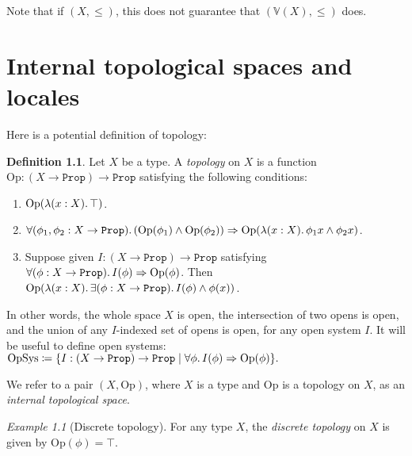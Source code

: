 \documentclass[11pt, oneside, article]{memoir}
\theoremstyle{plain}
\theoremstyle{definition}
\newtheorem{definition}[theorem]{Definition}
\theoremstyle{remark}
\newtheorem{example}[theorem]{Example}
\newcommand{\const}[1]{\mathtt{#1}}
\newcommand{\Set}[1]{\mathrm{#1}}
\newcommand{\VV}{\mathbb{V}}
\newcommand{\Prop}{\const{Prop}}
\newcommand{\Op}{\Set{Op}}
\newcommand{\imp}{\Rightarrow}
\begin{document}
Note that if $(X,\leq)$, this does not guarantee that $(\VV(X),\leq)$ does.

\chapter{Internal topological spaces and locales}


Here is a potential definition of topology:
\begin{definition}
Let $X$ be a type. A \emph{topology} on $X$ is a function $\Op:(X\to\Prop)\to\Prop$ satisfying the following conditions:
\begin{enumerate}
	\item $\Op(\lambda(x:X)\ldotp\top)$.
	\item $\forall(\phi_1,\phi_2:X\to\Prop)\ldotp(\Op(\phi_1)\wedge\Op(\phi_2))\imp\Op(\lambda(x:X)\ldotp\phi_1 x\wedge\phi_2 x)$.
	\item Suppose given $I:(X\to\Prop)\to\Prop$ satisfying $\forall(\phi:X\to\Prop)\ldotp I(\phi)\imp\Op(\phi)$. Then $\Op(\lambda(x:X)\ldotp\exists(\phi:X\to\Prop)\ldotp I(\phi)\wedge\phi (x))$.
\end{enumerate}
In other words, the whole space $X$ is open, the intersection of two opens is open, and the union of any $I$-indexed set of opens is open, for any open system $I$. It will be useful to define open systems: $\mathrm{OpSys}\coloneqq\{I:(X\to\Prop)\to\Prop\mid\forall \phi\ldotp I(\phi)\imp\Op(\phi)\}.$

We refer to a pair $(X,\Op)$, where $X$ is a type and $\Op$ is a topology on $X$, as an \emph{internal topological space}.
\end{definition}

\begin{example}[Discrete topology]
For any type $X$, the \emph{discrete topology} on $X$ is given by $\Op(\phi)=\top$.
\end{example}
\end{document}
